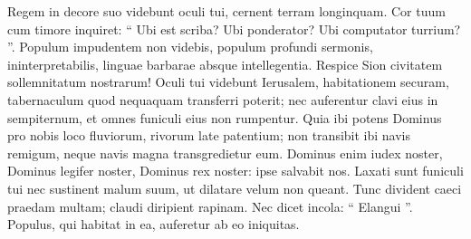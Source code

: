 \begin{biblechapter}
\begin{biblechapter}
\begin{biblechapter}
\begin{biblechapter}
\begin{biblechapter}
\begin{biblechapter}
\begin{biblechapter}
\begin{biblechapter}
\begin{biblechapter}
\begin{biblechapter}
\begin{biblechapter}
\begin{biblechapter}
\begin{biblechapter}
\begin{biblechapter}
\begin{biblechapter}
\begin{biblechapter}
\begin{biblechapter}
\begin{biblechapter}
\begin{biblechapter}
\begin{biblechapter}
\begin{biblechapter}
\begin{biblechapter}
\begin{biblechapter}
\begin{biblechapter}
\begin{biblechapter}
\begin{biblechapter}
\begin{biblechapter}
\begin{biblechapter}
\begin{biblechapter}
\begin{biblechapter}
\begin{biblechapter}
\begin{biblechapter}
\begin{biblechapter}
 \verse Regem in decore suo videbunt oculi tui,
 cernent terram longinquam.
 \verse Cor tuum cum timore inquiret:
 “ Ubi est scriba? Ubi ponderator?
 Ubi computator turrium? ”.
 \verse Populum impudentem non videbis,
 populum profundi sermonis, ininterpretabilis,
 linguae barbarae absque intellegentia.
 \verse Respice Sion civitatem sollemnitatum nostrarum!
 Oculi tui videbunt Ierusalem,
 habitationem securam,
 tabernaculum quod nequaquam transferri poterit;
 nec auferentur clavi eius in sempiternum,
 et omnes funiculi eius non rumpentur.
 \verse Quia ibi potens Dominus pro nobis
 loco fluviorum, rivorum late patentium;
 non transibit ibi navis remigum,
 neque navis magna transgredietur eum.
 \verse Dominus enim iudex noster, Dominus legifer noster,
 Dominus rex noster: ipse salvabit nos.
 \verse Laxati sunt funiculi tui
 nec sustinent malum suum,
 ut dilatare velum non queant.
 Tunc divident caeci praedam multam;
 claudi diripient rapinam.
 \verse Nec dicet incola: “ Elangui ”.
 Populus, qui habitat in ea,
 auferetur ab eo iniquitas.
 

\end{biblechapter}
\end{biblechapter}
\end{biblechapter}
\end{biblechapter}
\end{biblechapter}
\end{biblechapter}
\end{biblechapter}
\end{biblechapter}
\end{biblechapter}
\end{biblechapter}
\end{biblechapter}
\end{biblechapter}
\end{biblechapter}
\end{biblechapter}
\end{biblechapter}
\end{biblechapter}
\end{biblechapter}
\end{biblechapter}
\end{biblechapter}
\end{biblechapter}
\end{biblechapter}
\end{biblechapter}
\end{biblechapter}
\end{biblechapter}
\end{biblechapter}
\end{biblechapter}
\end{biblechapter}
\end{biblechapter}
\end{biblechapter}
\end{biblechapter}
\end{biblechapter}
\end{biblechapter}
\end{biblechapter}
